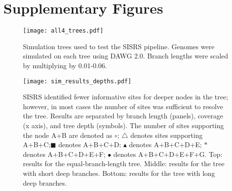 \documentclass[11pt, oneside]{article}   	%
\begin{document}
%

\clearpage
\section{Supplementary Figures}
\setcounter{figure}{0} 

\begin{figure}[!ht]
\texttt{[image: all4\_trees.pdf]}
\caption{Simulation trees used to test the SISRS pipeline. Genomes were simulated on each tree using DAWG 2.0. Branch lengths were scaled by multiplying by 0.01-0.06.}
\label{fig:trees}
\end{figure}

\begin{figure}[!ht]
\texttt{[image: sim\_results\_depths.pdf]}
\caption{SISRS identified fewer informative sites for deeper nodes in the tree; however, in most cases the number of sites was sufficient to resolve the tree. 
Results are separated by branch length (panels), coverage (x axis), and tree depth (symbols). 
The number of sites supporting the node A+B are denoted as $\circ$; $\triangle$ denotes sites supporting A+B+C;$\blacksquare$ denotes A+B+C+D; $\blacktriangle$ denotes A+B+C+D+E; $\ast$ denotes A+B+C+D+E+F; $\bullet$ denotes A+B+C+D+E+F+G.
Top: results for the equal-branch-length tree. Middle: results for the tree with short deep branches. Bottom: results for the tree with long deep branches.}
\label{fig:sim_results_all_depths}
\end{figure}

\end{document}
